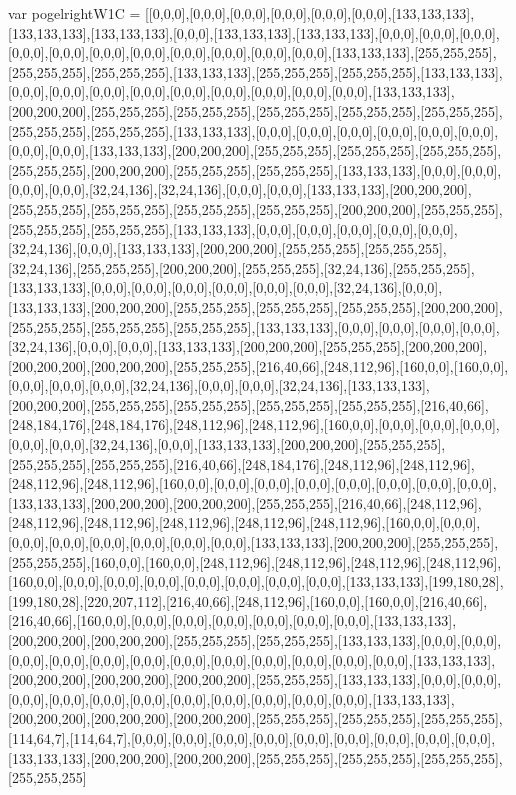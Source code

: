 var pogelrightW1C = [[0,0,0],[0,0,0],[0,0,0],[0,0,0],[0,0,0],[0,0,0],[133,133,133],[133,133,133],[133,133,133],[0,0,0],[133,133,133],[133,133,133],[0,0,0],[0,0,0],[0,0,0],[0,0,0],[0,0,0],[0,0,0],[0,0,0],[0,0,0],[0,0,0],[0,0,0],[0,0,0],[133,133,133],[255,255,255],[255,255,255],[255,255,255],[133,133,133],[255,255,255],[255,255,255],[133,133,133],[0,0,0],[0,0,0],[0,0,0],[0,0,0],[0,0,0],[0,0,0],[0,0,0],[0,0,0],[0,0,0],[133,133,133],[200,200,200],[255,255,255],[255,255,255],[255,255,255],[255,255,255],[255,255,255],[255,255,255],[255,255,255],[133,133,133],[0,0,0],[0,0,0],[0,0,0],[0,0,0],[0,0,0],[0,0,0],[0,0,0],[0,0,0],[133,133,133],[200,200,200],[255,255,255],[255,255,255],[255,255,255],[255,255,255],[200,200,200],[255,255,255],[255,255,255],[133,133,133],[0,0,0],[0,0,0],[0,0,0],[0,0,0],[32,24,136],[32,24,136],[0,0,0],[0,0,0],[133,133,133],[200,200,200],[255,255,255],[255,255,255],[255,255,255],[255,255,255],[200,200,200],[255,255,255],[255,255,255],[255,255,255],[133,133,133],[0,0,0],[0,0,0],[0,0,0],[0,0,0],[0,0,0],[32,24,136],[0,0,0],[133,133,133],[200,200,200],[255,255,255],[255,255,255],[32,24,136],[255,255,255],[200,200,200],[255,255,255],[32,24,136],[255,255,255],[133,133,133],[0,0,0],[0,0,0],[0,0,0],[0,0,0],[0,0,0],[0,0,0],[32,24,136],[0,0,0],[133,133,133],[200,200,200],[255,255,255],[255,255,255],[255,255,255],[200,200,200],[255,255,255],[255,255,255],[255,255,255],[133,133,133],[0,0,0],[0,0,0],[0,0,0],[0,0,0],[32,24,136],[0,0,0],[0,0,0],[133,133,133],[200,200,200],[255,255,255],[200,200,200],[200,200,200],[200,200,200],[255,255,255],[216,40,66],[248,112,96],[160,0,0],[160,0,0],[0,0,0],[0,0,0],[0,0,0],[32,24,136],[0,0,0],[0,0,0],[32,24,136],[133,133,133],[200,200,200],[255,255,255],[255,255,255],[255,255,255],[255,255,255],[216,40,66],[248,184,176],[248,184,176],[248,112,96],[248,112,96],[160,0,0],[0,0,0],[0,0,0],[0,0,0],[0,0,0],[0,0,0],[32,24,136],[0,0,0],[133,133,133],[200,200,200],[255,255,255],[255,255,255],[255,255,255],[216,40,66],[248,184,176],[248,112,96],[248,112,96],[248,112,96],[248,112,96],[160,0,0],[0,0,0],[0,0,0],[0,0,0],[0,0,0],[0,0,0],[0,0,0],[0,0,0],[133,133,133],[200,200,200],[200,200,200],[255,255,255],[216,40,66],[248,112,96],[248,112,96],[248,112,96],[248,112,96],[248,112,96],[248,112,96],[160,0,0],[0,0,0],[0,0,0],[0,0,0],[0,0,0],[0,0,0],[0,0,0],[0,0,0],[133,133,133],[200,200,200],[255,255,255],[255,255,255],[160,0,0],[160,0,0],[248,112,96],[248,112,96],[248,112,96],[248,112,96],[160,0,0],[0,0,0],[0,0,0],[0,0,0],[0,0,0],[0,0,0],[0,0,0],[0,0,0],[133,133,133],[199,180,28],[199,180,28],[220,207,112],[216,40,66],[248,112,96],[160,0,0],[160,0,0],[216,40,66],[216,40,66],[160,0,0],[0,0,0],[0,0,0],[0,0,0],[0,0,0],[0,0,0],[0,0,0],[133,133,133],[200,200,200],[200,200,200],[255,255,255],[255,255,255],[133,133,133],[0,0,0],[0,0,0],[0,0,0],[0,0,0],[0,0,0],[0,0,0],[0,0,0],[0,0,0],[0,0,0],[0,0,0],[0,0,0],[0,0,0],[133,133,133],[200,200,200],[200,200,200],[200,200,200],[255,255,255],[133,133,133],[0,0,0],[0,0,0],[0,0,0],[0,0,0],[0,0,0],[0,0,0],[0,0,0],[0,0,0],[0,0,0],[0,0,0],[0,0,0],[133,133,133],[200,200,200],[200,200,200],[200,200,200],[255,255,255],[255,255,255],[255,255,255],[114,64,7],[114,64,7],[0,0,0],[0,0,0],[0,0,0],[0,0,0],[0,0,0],[0,0,0],[0,0,0],[0,0,0],[0,0,0],[133,133,133],[200,200,200],[200,200,200],[255,255,255],[255,255,255],[255,255,255],[255,255,255]